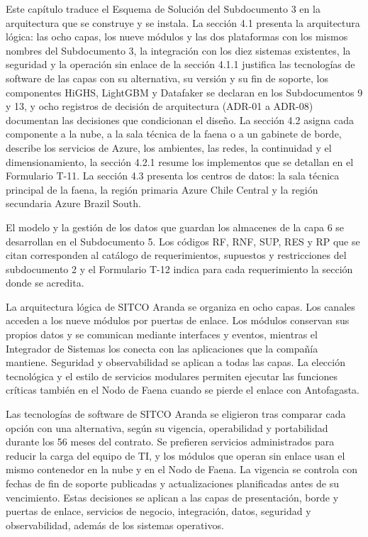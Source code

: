 \documentclass[subdoc]{../../comun/overfore}
\begin{document}
Este capítulo traduce el Esquema de Solución del Subdocumento 3 en la arquitectura que se construye y se instala. La sección 4.1 presenta la arquitectura lógica: las ocho capas, los nueve módulos y las dos plataformas con los mismos nombres del Subdocumento 3, la integración con los diez sistemas existentes, la seguridad y la operación sin enlace de la sección 4.1.1 justifica las tecnologías de software de las capas con su alternativa, su versión y su fin de soporte, los componentes HiGHS, LightGBM y Datafaker se declaran en los Subdocumentos 9 y 13, y ocho registros de decisión de arquitectura (ADR-01 a ADR-08) documentan las decisiones que condicionan el diseño. La sección 4.2 asigna cada componente a la nube, a la sala técnica de la faena o a un gabinete de borde, describe los servicios de Azure, los ambientes, las redes, la continuidad y el dimensionamiento, la sección 4.2.1 resume los implementos que se detallan en el Formulario T-11. La sección 4.3 presenta los centros de datos: la sala técnica principal de la faena, la región primaria Azure Chile Central y la región secundaria Azure Brazil South.

El modelo y la gestión de los datos que guardan los almacenes de la capa 6 se desarrollan en el Subdocumento 5. Los códigos RF, RNF, SUP, RES y RP que se citan corresponden al catálogo de requerimientos, supuestos y restricciones del subdocumento 2 y el Formulario T-12 indica para cada requerimiento la sección donde se acredita.

La arquitectura lógica de SITCO Aranda se organiza en ocho capas. Los canales acceden a los nueve módulos por puertas de enlace. Los módulos conservan sus propios datos y se comunican mediante interfaces y eventos, mientras el Integrador de Sistemas los conecta con las aplicaciones que la compañía mantiene. Seguridad y observabilidad se aplican a todas las capas. La elección tecnológica y el estilo de servicios modulares permiten ejecutar las funciones críticas también en el Nodo de Faena cuando se pierde el enlace con Antofagasta.

Las tecnologías de software de SITCO Aranda se eligieron tras comparar cada opción con una alternativa, según su vigencia, operabilidad y portabilidad durante los 56 meses del contrato. Se prefieren servicios administrados para reducir la carga del equipo de TI, y los módulos que operan sin enlace usan el mismo contenedor en la nube y en el Nodo de Faena. La vigencia se controla con fechas de fin de soporte publicadas y actualizaciones planificadas antes de su vencimiento. Estas decisiones se aplican a las capas de presentación, borde y puertas de enlace, servicios de negocio, integración, datos, seguridad y observabilidad, además de los sistemas operativos.
\end{document}
